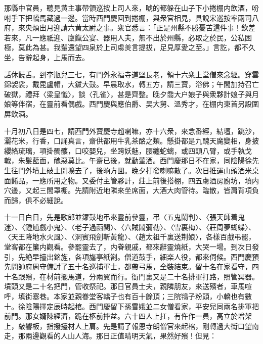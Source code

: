 那縣中官員，聽見黄主事帶領巡按上司人來，唬的都躲在山子下小捲棚内飲酒，吩咐手下把轎馬藏過一邊。當時西門慶回到捲棚，與衆官相見，具說宋巡按率兩司八府，來央煩出月迎請六黄太尉之事。衆官悉言：「正是州縣不勝憂苦這件事！欽差若來，凡一應祇迎、廩餼公宴、器用人夫，無不出於州縣，必取之於民，公私困極，莫此為甚。我輩還望四泉於上司䖏羙言提拔，足見厚愛之至。」言訖，都不久坐，告辭起身，上馬而去。

話休饒舌。到李瓶兒三七，有門外永福寺道堅長老，領十六衆上堂僧來念經。穿雲錦袈裟，戴毘盧帽，大鈸大鼓。早晨取水，轉五方，請三寳，浴佛；午間加持召亡破獄，禮拜〈梁皇懺〉，談〈孔雀〉，甚是齊整。晚夕喬大户娘子與衆夥計娘子與月娘等伴宿，在靈前看偶戲。西門慶與應伯爵、吴大舅、溫秀才，在棚内東首另設圍屏飲酒。

十月初八日是四七，請西門外寳慶寺趙喇嘛，亦十六衆，來念番經，結壇，跳沙，灑花米，行香，口誦真言，齋供都用牛乳茶酪之類。懸掛都是九醜天魔變相，身披纓絡琉璃，項掛髑髏，口咬嬰兒，坐跨妖魅，腰纏蛇螭，或四頭八臂，或手執戈戟，朱髮藍面，醜惡莫比。午齋已後，就動葷酒。西門慶那日不在家，同陰陽徐先生往門外墳上破土開壙去了，後晌方囬。晚夕打發喇嘛散了。次日推運山頭酒米桌面餚品，一應所用之物。又委付主管夥計，莊上前後搭棚，四五䖏酒房廚坊，墳内穴邊，又起三間罩棚。先請附近地隣來坐席面，大酒大肉管待。臨散，皆肩背項負而歸，俱不必細說。

十一日白日，先是歌郎並鑼鼓地弔來靈前參靈，弔〈五鬼鬧判〉、〈張天師着鬼迷〉、〈鍾馗戲小鬼〉、〈老子過函関〉、〈六賊鬧彌勒〉、〈雪裏梅〉、〈莊周夢蝴蝶〉、〈天王降地水火風〉、〈洞賓飛劍斬黃龍〉、〈趙太祖千裏送荆娘〉，各樣百戲弔罷，堂客都在簾内觀看。參罷靈去了，内眷親戚，都來辭靈燒紙，大哭一場。到次日發引，先絶早擡出銘旌，各項旛亭紙劄。僧道鼓手，細楽人役，都來伺候。西門慶預先問帥府周守備討了五十名巡捕軍士，都帶弓馬，全裝結束。留十名在家看守，四十名跟殯，在材前擺馬道，分兩翼而行。衙門裏又是二十名排軍打路，照管冥器。墳頭又是二十名把門，管收祭祀。那日官員士夫，親隣朋友，來送殯者，車馬喧呼，填街塞巷。本家並親眷堂客轎子也有百十餘頂；三院鴇子粉頭，小轎也有數十。徐陰陽擇定辰時起棺。西門慶留下孫雪娥並二女僧看家，平安兒同兩名排軍把前門。那女婿陳經濟，跪在柩前摔盆。六十四人上扛，有仵作一員，高立於增架上，敲響板，指撥擡材人上肩。先是請了報恩寺朗僧官來起棺，剛轉過大街口望南走，那兩邊觀看的人山人海。那日正值晴明天氣，果然好殯！但見：

